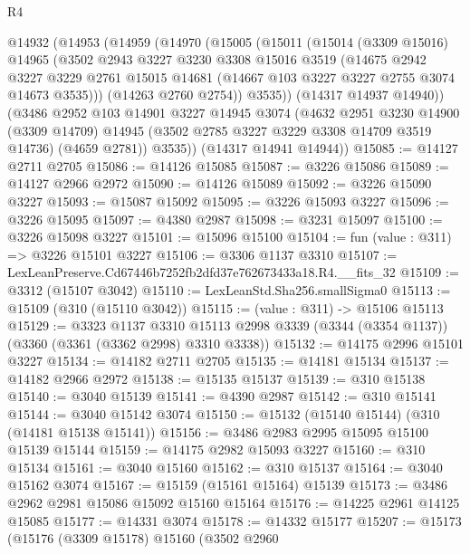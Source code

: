 \begin{lexlean}{R4}
\begin{coremodule}
  @14932
    (@14953
      (@14959
        (@14970
          (@15005
            (@15011
              (@15014
                (@3309 @15016)
                @14965
                (@3502
                  @2943
                  @3227
                  @3230
                  @3308
                  @15016
                  @3519
                  (@14675
                    @2942
                    @3227
                    @3229
                    @2761
                    @15015
                    @14681
                    (@14667 @103 @3227 @3227 @2755 @3074 @14673 @3535)))
                (@14263 @2760 @2754))
              @3535))
          (@14317 @14937 @14940))
        (@3486
          @2952
          @103
          @14901
          @3227
          @14945
          @3074
          (@4632
            @2951
            @3230
            @14900
            (@3309 @14709)
            @14945
            (@3502 @2785 @3227 @3229 @3308 @14709 @3519 @14736)
            (@4659 @2781))
          @3535))
      (@14317 @14941 @14944))
@15085 := @14127 @2711 @2705
@15086 := @14126 @15085
@15087 := @3226 @15086
@15089 := @14127 @2966 @2972
@15090 := @14126 @15089
@15092 := @3226 @15090 @3227
@15093 := @15087 @15092
@15095 := @3226 @15093 @3227
@15096 := @3226 @15095
@15097 := @4380 @2987
@15098 := @3231 @15097
@15100 := @3226 @15098 @3227
@15101 := @15096 @15100
@15104 := fun (value : @311) => @3226 @15101 @3227
@15106 := @3306 @1137 @3310
@15107 := LexLeanPreserve.Cd67446b7252fb2dfd37e762673433a18.R4.__fits_32
@15109 := @3312 (@15107 @3042)
@15110 := LexLeanStd.Sha256.smallSigma0
@15113 := @15109 (@310 (@15110 @3042))
@15115 := (value : @311) -> @15106 @15113
@15129 := @3323
    @1137
    @3310
    @15113
    @2998
    @3339
    (@3344 (@3354 @1137))
    (@3360 (@3361 (@3362 @2998) @3310 @3338))
@15132 := @14175 @2996 @15101 @3227
@15134 := @14182 @2711 @2705
@15135 := @14181 @15134
@15137 := @14182 @2966 @2972
@15138 := @15135 @15137
@15139 := @310 @15138
@15140 := @3040 @15139
@15141 := @4390 @2987
@15142 := @310 @15141
@15144 := @3040 @15142 @3074
@15150 := @15132 (@15140 @15144) (@310 (@14181 @15138 @15141))
@15156 := @3486 @2983 @2995 @15095 @15100 @15139 @15144
@15159 := @14175 @2982 @15093 @3227
@15160 := @310 @15134
@15161 := @3040 @15160
@15162 := @310 @15137
@15164 := @3040 @15162 @3074
@15167 := @15159 (@15161 @15164) @15139
@15173 := @3486 @2962 @2981 @15086 @15092 @15160 @15164
@15176 := @14225 @2961 @14125 @15085
@15177 := @14331 @3074
@15178 := @14332 @15177
@15207 := @15173
    (@15176
      (@3309 @15178)
      @15160
      (@3502
        @2960

\end{coremodule}
\end{lexlean}
